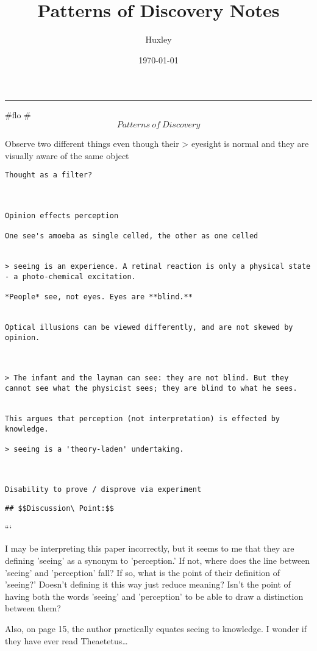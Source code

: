 \documentclass[letterpaper]{article}
\author{Huxley}
\date{\today}
\title{Patterns of Discovery Notes}
\renewcommand{\tableofcontents}{}
\begin{document}
\tableofcontents

\noindent\rule{\textwidth}{0.5pt}

\#flo \# \[Patterns\ of\ Discovery\]

Observe two different things even though their > eyesight is normal and
they are visually aware of the same object

\begin{verbatim}
Thought as a filter? 



Opinion effects perception

One see's amoeba as single celled, the other as one celled 


> seeing is an experience. A retinal reaction is only a physical state - a photo-chemical excitation. 

*People* see, not eyes. Eyes are **blind.** 


Optical illusions can be viewed differently, and are not skewed by opinion. 



> The infant and the layman can see: they are not blind. But they cannot see what the physicist sees; they are blind to what he sees. 


This argues that perception (not interpretation) is effected by knowledge.

> seeing is a 'theory-laden' undertaking. 



Disability to prove / disprove via experiment 

\end{verbatim}

\begin{verbatim}
## $$Discussion\ Point:$$ 
\end{verbatim}

```

I may be interpreting this paper incorrectly, but it seems to me that
they are defining 'seeing' as a synonym to 'perception.' If not, where
does the line between 'seeing' and 'perception' fall? If so, what is the
point of their definition of 'seeing?' Doesn't defining it this way just
reduce meaning? Isn't the point of having both the words 'seeing' and
'perception' to be able to draw a distinction between them?

Also, on page 15, the author practically equates seeing to knowledge. I
wonder if they have ever read Theaetetus\ldots{}
\end{document}

